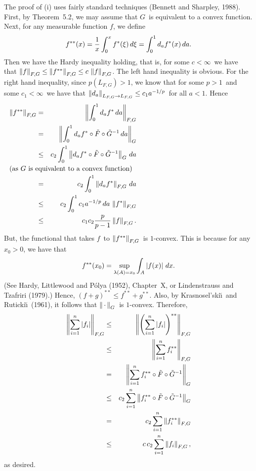 The proof of (i) uses fairly standard techniques 
(Bennett and Sharpley, 1988). First, by Theorem~5.2, 
we may assume that $G$\ is equivalent to 
a convex function. Next,
for any measurable function $f$, we define
$$ f^{**}(x) = {1\over x} \int_0^x f^*(\xi) \,d\xi
   = \int_0^1 d_a f^*(x) \,da .$$
Then we have the Hardy inequality holding, that is, for some $c<\infty$\ we
have that $\left\| f \right\|_{F,G} \le \left\| f^{**} \right\|_{F,G} \le c\,\left\| f \right\|_{F,G}$. 
The
left hand inequality is obvious. For the right hand inequality, since
$p(L_{F,G}) > 1$, we know that for some $p>1$\ and some $c_1<\infty$\ we have
that $\left\| d_a \right\|_{L_{F,G}\to L_{F,G}} \le c_1 a^{-1/p}$\ for all $a<1$. 
Hence
\begin{eqnarray*}
   \normo{f^{**}}_{F,G}
   &=& \normo{ \int_0^1 d_a f^* \,da }_{F,G} \\
   &=& \normo{ \int_0^1 d_a f^*\circ\tilde F\circ\tilde G^{-1} \,da }_G \\
   &\le& c_2 \int_0^1 \normo{ d_a f^*\circ\tilde F\circ\tilde 
         G^{-1} }_G \,da \\
\noalign{\noindent(as $G$\ is equivalent to a convex function)}
   &=& c_2 \int_0^1 \normo{ d_a f^* }_{F,G} \,da \\
   &\le& c_2 \int_0^1 c_1 a^{-1/p} \,da \, \normo{f^*}_{F,G} \\
   &\le& c_1 c_2 {p\over p-1} \normo f_{F,G} .
\end{eqnarray*}
But, the functional that takes $f$\ to $\left\| f^{**} \right\|_{F,G}$\
is $1$-convex. This is because for any $x_0>0$, we have that
$$ f^{**}(x_0) = \sup_{\lambda(A) = x_0} \int_A \left| f(x) \right|\,dx .$$
(See Hardy, Littlewood and P\'olya (1952), Chapter~X, or 
Lindenstrauss and Tzafriri (1979).)
Hence, $(f+g)^{**} \le f^{**} + g^{**}$. Also, by Krasnosel'ski\u\i\ and 
Ruticki\u\i\ (1961), 
it follows that $\left\| \,\cdot\, \right\|_G$\ is $1$-convex. Therefore,
\begin{eqnarray*}
   \left\| \sum_{i=1}^n \left| f_i \right| \right\|_{F,G}
   &\le& \left\| \left(\sum_{i=1}^n \left| f_i \right|\right)^{**} \right\|_{F,G} \\
   &\le& \left\| \sum_{i=1}^n f_i^{**} \right\|_{F,G} \\
   &=& \left\| \sum_{i=1}^n f_i^{**}\circ \tilde F \circ\tilde G^{-1} \right\|_G \\
   &\le& c_2 \sum_{i=1}^n \left\| f_i^{**}\circ \tilde F 
         \circ\tilde G^{-1} \right\|_G \\
   &=& c_2 \sum_{i=1}^n \left\| f_i^{**} \right\|_{F,G} \\
   &\le& c\,c_2 \sum_{i=1}^n \left\| f_i \right\|_{F,G} ,
\end{eqnarray*}
as desired.

